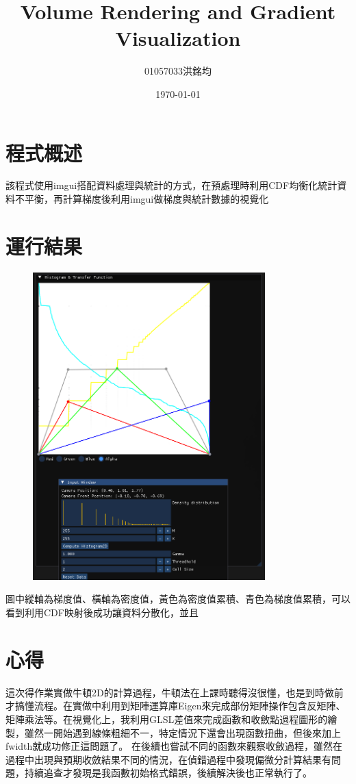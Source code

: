 \documentclass[a4paper,12pt]{article}
\title{Volume Rendering and Gradient Visualization}
\author{01057033洪銘均}
\date{\today}
\begin{document}
\maketitle
\tableofcontents
\newpage

\section{程式概述}
該程式使用imgui搭配資料處理與統計的方式，在預處理時利用CDF均衡化統計資料不平衡，再計算梯度後利用imgui做梯度與統計數據的視覺化



\section{運行結果}

\begin{figure}[h]
    \centering
    \includegraphics[width=0.8\textwidth]{img/img2.png}
\end{figure}
圖中縱軸為梯度值、橫軸為密度值，黃色為密度值累積、青色為梯度值累積，可以看到利用CDF映射後成功讓資料分散化，並且

\section{心得}
這次得作業實做牛頓2D的計算過程，牛頓法在上課時聽得沒很懂，也是到時做前才搞懂流程。在實做中利用到矩陣運算庫Eigen來完成部份矩陣操作包含反矩陣、矩陣乘法等。在視覺化上，我利用GLSL差值來完成函數和收斂點過程圖形的繪製，雖然一開始遇到線條粗細不一，特定情況下還會出現函數扭曲，但後來加上fwidth就成功修正這問題了。
在後續也嘗試不同的函數來觀察收斂過程，雖然在過程中出現與預期收斂結果不同的情況，在偵錯過程中發現偏微分計算結果有問題，持續追查才發現是我函數初始格式錯誤，後續解決後也正常執行了。
\end{document}
